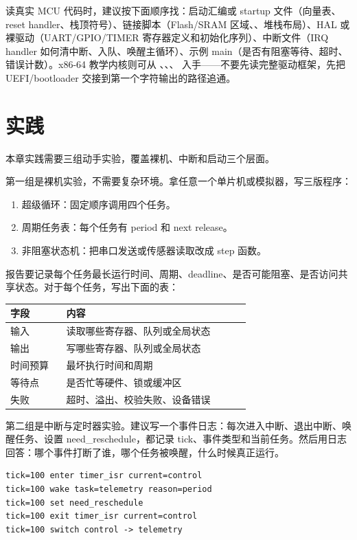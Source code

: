 读真实 MCU 代码时，建议按下面顺序找：启动汇编或 startup 文件（向量表、reset handler、栈顶符号）、链接脚本（Flash/SRAM 区域、、堆栈布局）、HAL 或裸驱动（UART/GPIO/TIMER 寄存器定义和初始化序列）、中断文件（IRQ handler 如何清中断、入队、唤醒主循环）、示例 main（是否有阻塞等待、超时、错误计数）。x86-64 教学内核则可从 、、、 入手——不要先读完整驱动框架，先把 UEFI/bootloader 交接到第一个字符输出的路径追通。

\section{实践}

本章实践需要三组动手实验，覆盖裸机、中断和启动三个层面。

第一组是裸机实验，不需要复杂环境。拿任意一个单片机或模拟器，写三版程序：

\begin{enumerate}
\tightlist
\item 超级循环：固定顺序调用四个任务。
\item 周期任务表：每个任务有 period 和 next release。
\item 非阻塞状态机：把串口发送或传感器读取改成 step 函数。
\end{enumerate}

报告要记录每个任务最长运行时间、周期、deadline、是否可能阻塞、是否访问共享状态。对于每个任务，写出下面的表：

\begin{longtable}{p{0.2\linewidth}p{0.66\linewidth}}
\toprule
字段 & 内容 \\
\midrule
输入 & 读取哪些寄存器、队列或全局状态 \\
输出 & 写哪些寄存器、队列或全局状态 \\
时间预算 & 最坏执行时间和周期 \\
等待点 & 是否忙等硬件、锁或缓冲区 \\
失败 & 超时、溢出、校验失败、设备错误 \\
\bottomrule
\end{longtable}

第二组是中断与定时器实验。建议写一个事件日志：每次进入中断、退出中断、唤醒任务、设置 need\_reschedule，都记录 tick、事件类型和当前任务。然后用日志回答：哪个事件打断了谁，哪个任务被唤醒，什么时候真正运行。

\begin{lstlisting}
tick=100 enter timer_isr current=control
tick=100 wake task=telemetry reason=period
tick=100 set need_reschedule
tick=100 exit timer_isr current=control
tick=100 switch control -> telemetry
\end{lstlisting}

